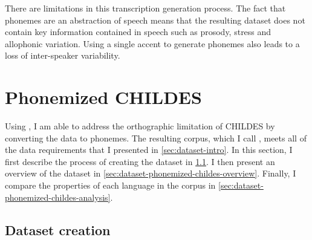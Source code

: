 There are limitations in this transcription generation process. The fact that phonemes are an abstraction of speech means that the resulting dataset does not contain key information contained in speech such as prosody, stress and allophonic variation. Using a single accent to generate phonemes also leads to a loss of inter-speaker variability.


\section{Phonemized CHILDES}
\label{sec:dataset-phonemized-childes}

Using \corpusphonemizer, I am able to address the orthographic limitation of CHILDES by converting the data to phonemes. The resulting corpus, which I call \phonemizedchildes, meets all of the data requirements that I presented in \cref{sec:dataset-intro}. In this section, I first describe the process of creating the dataset in \cref{sec:dataset-phonemized-childes-creation}. I then present an overview of the dataset in \cref{sec:dataset-phonemized-childes-overview}. Finally, I compare the properties of each language in the corpus in \cref{sec:dataset-phonemized-childes-analysis}.

\subsection{Dataset creation}
\label{sec:dataset-phonemized-childes-creation}

